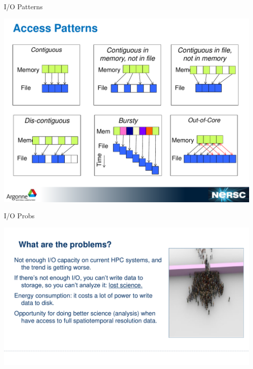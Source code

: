 \documentclass[compress,11pt,xcolor=svgnames,aspectratio=169]{beamer}
\begin{document}
\begin{frame}[t]{I/O Patterns}

\begin{center}
\includegraphics[scale=0.3]{io-patterns}
\end{center}

\end{frame}

\begin{frame}[t]{I/O Probs}

\begin{center}
\includegraphics[scale=0.5]{io-probs}
\end{center}

\end{frame}
\end{document}
